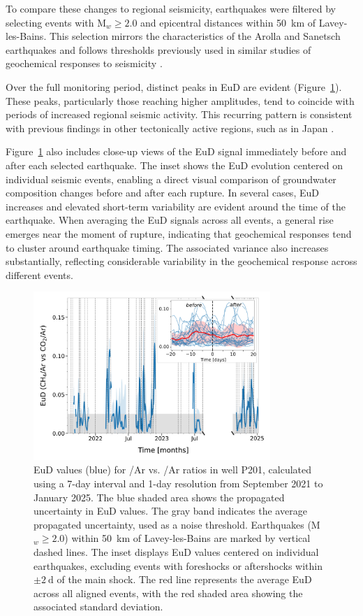 To compare these changes to regional seismicity, earthquakes were filtered by selecting events with M$_w \geq 2.0$ and epicentral distances within \SI{50}{\kilo\meter} of Lavey-les-Bains.
This selection mirrors the characteristics of the Arolla and Sanetsch earthquakes and follows thresholds previously used in similar studies of geochemical responses to seismicity \citep{chiodini2020co2}.

Over the full monitoring period, distinct peaks in EuD are evident (Figure~\ref{fig:EuD_EuD7}).
These peaks, particularly those reaching higher amplitudes, tend to coincide with periods of increased regional seismic activity.
This recurring pattern is consistent with previous findings in other tectonically active regions, such as in Japan \citep{giroud2023new}.

Figure~\ref{fig:EuD_EuD7} also includes close-up views of the EuD signal immediately before and after each selected earthquake.
The inset shows the EuD evolution centered on individual seismic events, enabling a direct visual comparison of groundwater composition changes before and after each rupture.
In several cases, EuD increases and elevated short-term variability are evident around the time of the earthquake.
When averaging the EuD signals across all events, a general rise emerges near the moment of rupture, indicating that geochemical responses tend to cluster around earthquake timing.
The associated variance also increases substantially, reflecting considerable variability in the geochemical response across different events.

\begin{figure}[H]
    \centering
    \includegraphics[width=0.8\textwidth]{chapters/04_chap3/figures/full_EuD_7_article.pdf}
    \caption{
    EuD values (blue) for /Ar vs. /Ar ratios in well P201, calculated using a 7-day interval and 1-day resolution from September 2021 to January 2025.
    The blue shaded area shows the propagated uncertainty in EuD values.
    The gray band indicates the average propagated uncertainty, used as a noise threshold.
    Earthquakes (M$_w \geq 2.0$) within \SI{50}{\kilo\meter} of Lavey-les-Bains are marked by vertical dashed lines.
    The inset displays EuD values centered on individual earthquakes, excluding events with foreshocks or aftershocks within $\pm \SI{2}{\day}$ of the main shock.
    The red line represents the average EuD across all aligned events, with the red shaded area showing the associated standard deviation.
    }
    \label{fig:EuD_EuD7}
\end{figure}

